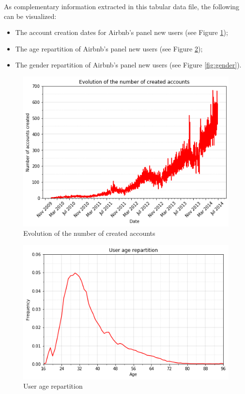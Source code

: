 \documentclass[twocolumn, switch]{article}
\begin{document}
As complementary information extracted in this tabular data file, the following can be visualized:
\begin{itemize}
\item The account creation dates for Airbnb's panel new users (see Figure \ref{fig:account});
\item The age repartition of Airbnb's panel new users (see Figure \ref{fig:age});
\item The gender repartition of Airbnb's panel new users (see Figure \ref{fig:gender}).
\end{itemize}

\begin{figure}[H]
\centering
\includegraphics[scale=0.35]{../graphs/train_users_2_date_account_created}
\caption{Evolution of the number of created accounts}
\label{fig:account}
\end{figure}

\begin{figure}[H]
\centering
\includegraphics[scale=0.35]{../graphs/train_users_2_age}
\caption{User age repartition}
\label{fig:age}
\end{figure}
\end{document}
